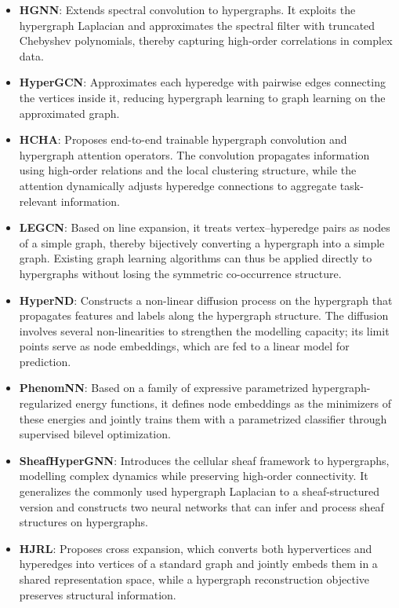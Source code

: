 \begin{itemize}
    \item \textbf{HGNN}\cite{feng2019hypergraph}: Extends spectral convolution to hypergraphs. It exploits the hypergraph Laplacian and approximates the spectral filter with truncated Chebyshev polynomials, thereby capturing high-order correlations in complex data.
    \item \textbf{HyperGCN}\cite{yadati2019hypergcn}: Approximates each hyperedge with pairwise edges connecting the vertices inside it, reducing hypergraph learning to graph learning on the approximated graph.
    \item \textbf{HCHA}\cite{bai2021hypergraph}: Proposes end-to-end trainable hypergraph convolution and hypergraph attention operators. The convolution propagates information using high-order relations and the local clustering structure, while the attention dynamically adjusts hyperedge connections to aggregate task-relevant information.
    \item \textbf{LEGCN}\cite{yang2022semi}: Based on line expansion, it treats vertex--hyperedge pairs as nodes of a simple graph, thereby bijectively converting a hypergraph into a simple graph. Existing graph learning algorithms can thus be applied directly to hypergraphs without losing the symmetric co-occurrence structure.
    \item \textbf{HyperND}\cite{prokopchik2022nonlinear}: Constructs a non-linear diffusion process on the hypergraph that propagates features and labels along the hypergraph structure. The diffusion involves several non-linearities to strengthen the modelling capacity; its limit points serve as node embeddings, which are fed to a linear model for prediction.
    \item \textbf{PhenomNN}\cite{wang2023from}: Based on a family of expressive parametrized hypergraph-regularized energy functions, it defines node embeddings as the minimizers of these energies and jointly trains them with a parametrized classifier through supervised bilevel optimization.
    \item \textbf{SheafHyperGNN}\cite{duta2023sheaf}: Introduces the cellular sheaf framework to hypergraphs, modelling complex dynamics while preserving high-order connectivity. It generalizes the commonly used hypergraph Laplacian to a sheaf-structured version and constructs two neural networks that can infer and process sheaf structures on hypergraphs.
    \item \textbf{HJRL}\cite{yan2024hypergraph}: Proposes cross expansion, which converts both hypervertices and hyperedges into vertices of a standard graph and jointly embeds them in a shared representation space, while a hypergraph reconstruction objective preserves structural information.

\end{itemize}
